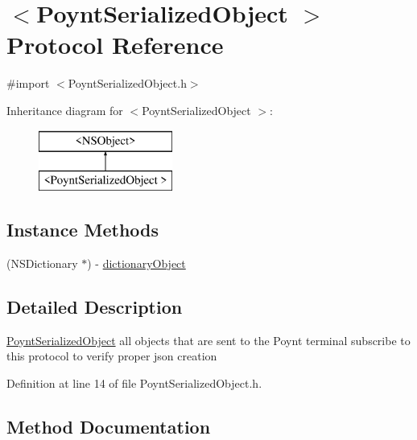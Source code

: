\hypertarget{protocol_poynt_serialized_object_01-p}{}\section{$<$Poynt\+Serialized\+Object $>$ Protocol Reference}
\label{protocol_poynt_serialized_object_01-p}


{\ttfamily \#import $<$Poynt\+Serialized\+Object.\+h$>$}

Inheritance diagram for $<$Poynt\+Serialized\+Object $>$\+:\begin{figure}[H]
\begin{center}
\leavevmode
\includegraphics[height=2.000000cm]{protocol_poynt_serialized_object_01-p}
\end{center}
\end{figure}
\subsection*{Instance Methods}
\begin{DoxyCompactItemize}
\item 
(N\+S\+Dictionary $\ast$) -\/ \hyperlink{protocol_poynt_serialized_object_01-p_a2482f2e9af7fe8eec4ba9710cdc963ee}{dictionary\+Object}
\end{DoxyCompactItemize}


\subsection{Detailed Description}
\hyperlink{class_poynt_serialized_object-p}{Poynt\+Serialized\+Object}  all objects that are sent to the Poynt terminal subscribe to this protocol to verify proper json creation 

Definition at line 14 of file Poynt\+Serialized\+Object.\+h.



\subsection{Method Documentation}
\hypertarget{protocol_poynt_serialized_object_01-p_a2482f2e9af7fe8eec4ba9710cdc963ee}{}\label{protocol_poynt_serialized_object_01-p_a2482f2e9af7fe8eec4ba9710cdc963ee} 
